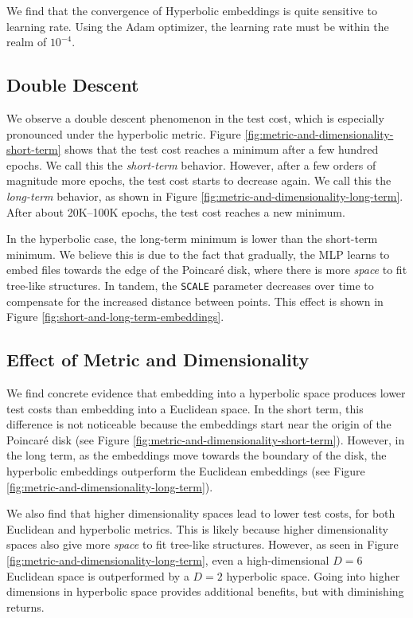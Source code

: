 \documentclass{article}
\begin{document}
We find that the convergence of Hyperbolic embeddings is quite sensitive to learning rate. Using the Adam optimizer, the learning rate must be within the realm of $10^{-4}$.

\subsection{Double Descent}

We observe a double descent phenomenon in the test cost, which is especially pronounced under the hyperbolic metric. Figure \ref{fig:metric-and-dimensionality-short-term} shows that the test cost reaches a minimum after a few hundred epochs. We call this the \emph{short-term} behavior. However, after a few orders of magnitude more epochs, the test cost starts to decrease again. We call this the \emph{long-term} behavior, as shown in Figure \ref{fig:metric-and-dimensionality-long-term}. After about 20K--100K epochs, the test cost reaches a new minimum.

In the hyperbolic case, the long-term minimum is lower than the short-term minimum. We believe this is due to the fact that gradually, the MLP learns to embed files towards the edge of the Poincaré disk, where there is more \emph{space} to fit tree-like structures. In tandem, the \texttt{SCALE} parameter decreases over time to compensate for the increased distance between points. This effect is shown in Figure \ref{fig:short-and-long-term-embeddings}.

\subsection{Effect of Metric and Dimensionality}

We find concrete evidence that embedding into a hyperbolic space produces lower test costs than embedding into a Euclidean space. In the short term, this difference is not noticeable because the embeddings start near the origin of the Poincaré disk (see Figure \ref{fig:metric-and-dimensionality-short-term}). However, in the long term, as the embeddings move towards the boundary of the disk, the hyperbolic embeddings outperform the Euclidean embeddings (see Figure \ref{fig:metric-and-dimensionality-long-term}).

We also find that higher dimensionality spaces lead to lower test costs, for both Euclidean and hyperbolic metrics. This is likely because higher dimensionality spaces also give more \emph{space} to fit tree-like structures. However, as seen in Figure \ref{fig:metric-and-dimensionality-long-term}, even a high-dimensional $D=6$ Euclidean space is outperformed by a $D=2$ hyperbolic space. Going into higher dimensions in hyperbolic space provides additional benefits, but with diminishing returns.
\end{document}
